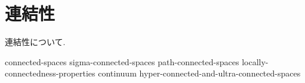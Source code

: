 \documentclass[uplatex, dvipdfmx, a4paper, 12pt, class=jsbook, crop=false]{standalone}
\begin{document}
\chapter{連結性}
\label{chap:connectedness}

連結性について.

{connected-spaces}
{sigma-connected-spaces}
{path-connected-spaces}
{locally-connectedness-properties}
{continuum}
{hyper-connected-and-ultra-connected-spaces}
\end{document}
